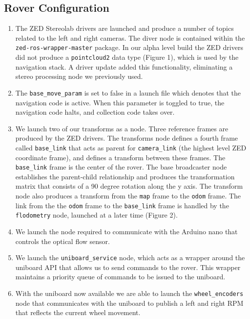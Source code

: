\documentclass[10pt, oneside,onecolumn]{IEEEtran}
\begin{document}
\subsection{Rover Configuration}
\begin{enumerate}
\item The ZED Stereolab drivers are launched and produce a number of topics related to the left and right cameras. The diver node is contained within the \texttt{zed-ros-wrapper-master} package. In our alpha level build the ZED drivers did not produce a \texttt{pointcloud2} data type (Figure 1), which is used by the navigation stack. A driver update added this functionality, eliminating a stereo processing node we previously used.

\item The \texttt{base\_move\_param} is set to false in a launch file which denotes that the navigation code is active. When this parameter is toggled to true, the navigation code halts, and collection code takes over. 

\item We launch two of our transforms as a node. Three reference frames are produced by the ZED drivers. The transforms node defines a fourth frame called \texttt{base\_link} that acts as parent for \texttt{camera\_link} (the highest level ZED coordinate frame), and defines a transform between these frames. The \texttt{base\_link} frame is the center of the rover. The base broadcaster node establishes the parent-child relationship and produces the transformation matrix that consists of a 90 degree rotation along the y axis. The transform node also produces a transform from the \texttt{map} frame to the \texttt{odom} frame. The link from the the \texttt{odom} frame to the \texttt{base\_link} frame is handled by the \texttt{flodometry} node, launched at a later time (Figure 2).

\item We launch the node required to communicate with the Arduino nano that controls the optical flow sensor. 

\item We launch the \texttt{uniboard\_service} node, which acts as a wrapper around the uniboard API that allows us to send commands to the rover. This wrapper maintains a priority queue of commands to be issued to the uniboard. 

\item With the uniboard now available we are able to launch the \texttt{wheel\_encoders} node that communicates with the uniboard to publish a left and right RPM that reflects the current wheel movement.


\end{enumerate}
\end{document}
